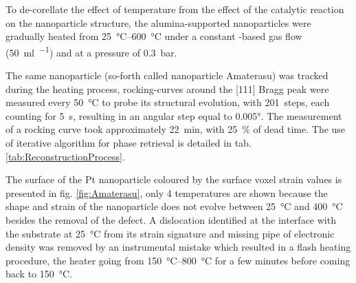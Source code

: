 To de-corellate the effect of temperature from the effect of the catalytic reaction on the nanoparticle structure, the alumina-supported nanoparticles were gradually heated from \qtyrange{25}{600}{\degreeCelsius} under a constant \argon-based gas flow (\qty{50}{\ml\per\min}) and at a pressure of \qty{0.3}{\bar}.

The same nanoparticle (so-forth called nanoparticle Amaterasu) was tracked during the heating process, rocking-curves around the [111] Bragg peak were measured every \qty{50}{\degreeCelsius} to probe its structural evolution, with \qty{201}{steps}, each counting for \qty{5}{\second}, resulting in an angular step equal to \ang{0.005}.
The measurement of a rocking curve took approximately \qty{22}{\minute}, with \qty{25}{\percent} of dead time.
The use of iterative algorithm for phase retrieval is detailed in tab. \ref{tab:ReconstructionProcess}.

\begin{table}[!htb]
\centering
{}
\caption{Example of algorithm chain used in BCDI for the phase retrieval.}
\label{tab:ReconstructionProcess}
\end{table}

The surface of the Pt nanoparticle coloured by the surface voxel strain values is presented in fig. \ref{fig:Amaterasu}, only 4 temperatures are shown because the shape and strain of the nanoparticle does not evolve between \qty{25}{\degreeCelsius} and \qty{400}{\degreeCelsius} besides the removal of the defect.
A dislocation identified at the interface with the substrate at \qty{25}{\degreeCelsius} from its strain signature and missing pipe of electronic density \parencite{Dupraz2015} was removed by an instrumental mistake which resulted in a flash heating procedure, the heater going from \qtyrange{150}{800}{\degreeCelsius} for a few minutes before coming back to \qty{150}{\degreeCelsius}.

